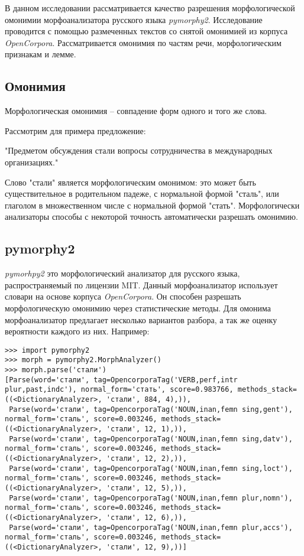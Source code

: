 \documentclass[a4paper,14pt]{article}
\begin{document}
	В данном исследовании рассматривается качество разрешения морфологической омонимии морфоанализатора русского языка \textit{pymorphy2}.
Исследование проводится с помощью размеченных текстов со снятой омонимией из корпуса \textit{OpenCorpora}.  Рассматривается омонимия по частям речи, морфологическим признакам и лемме.

	\subsection{Омонимия}

	Морфологическая омонимия – совпадение форм одного и того же слова.


	Рассмотрим для примера предложение: \begin{center}"Предметом обсуждения стали вопросы сотрудничества в международных организациях."\end{center}


	Слово "стали" является морфологическим омонимом: это может быть существительное в родительном падеже, с нормальной формой "сталь", или глаголом в множественном числе с нормальной формой "стать". Морфологически анализаторы способы с некоторой точность автоматически разрешать омонимию.
	\subsection{pymorphy2}

	\textit{pymorhpy2} это морфологический анализатор для русского языка, распространяемый по лицензии MIT. Данный морфоанализатор использует словари на основе корпуса \textit{OpenCorpora}. Он способен разрешать морфологическую омонимию через статистические методы. Для омонима морфоанализатор предлагает несколько вариантов разбора, а так же оценку вероятности каждого из них.
	\newpage
	Например:
		
\begin{lstlisting}
>>> import pymorphy2
>>> morph = pymorphy2.MorphAnalyzer()
>>> morph.parse('стали')
[Parse(word='стали', tag=OpencorporaTag('VERB,perf,intr plur,past,indc'), normal_form='стать', score=0.983766, methods_stack=((<DictionaryAnalyzer>, 'стали', 884, 4),)),
 Parse(word='стали', tag=OpencorporaTag('NOUN,inan,femn sing,gent'), normal_form='сталь', score=0.003246, methods_stack=((<DictionaryAnalyzer>, 'стали', 12, 1),)),
 Parse(word='стали', tag=OpencorporaTag('NOUN,inan,femn sing,datv'), normal_form='сталь', score=0.003246, methods_stack=((<DictionaryAnalyzer>, 'стали', 12, 2),)),
 Parse(word='стали', tag=OpencorporaTag('NOUN,inan,femn sing,loct'), normal_form='сталь', score=0.003246, methods_stack=((<DictionaryAnalyzer>, 'стали', 12, 5),)),
 Parse(word='стали', tag=OpencorporaTag('NOUN,inan,femn plur,nomn'), normal_form='сталь', score=0.003246, methods_stack=((<DictionaryAnalyzer>, 'стали', 12, 6),)),
 Parse(word='стали', tag=OpencorporaTag('NOUN,inan,femn plur,accs'), normal_form='сталь', score=0.003246, methods_stack=((<DictionaryAnalyzer>, 'стали', 12, 9),))]
\end{lstlisting}
	
\end{document}
